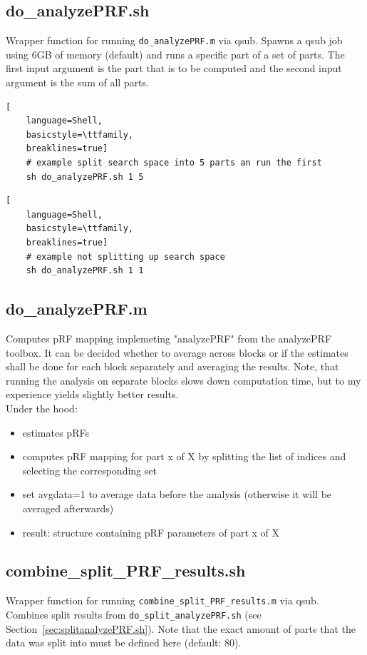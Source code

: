 \documentclass[12pt,a4paper]{scrartcl}
\begin{document}
\subsection{do\_analyzePRF.sh}
\label{sec:analyzePRF.sh}
Wrapper function for running \texttt{do\_analyzePRF.m} via qsub. Spawns a qsub job using 6GB of memory (default) and runs a specific part of a set of parts. The first input argument is the part that is to be computed and the second input argument is the sum of all parts.
\begin{lstlisting}[
    language=Shell,
    basicstyle=\ttfamily,
    breaklines=true]
    # example split search space into 5 parts an run the first
    sh do_analyzePRF.sh 1 5
\end{lstlisting}
\begin{lstlisting}[
    language=Shell,
    basicstyle=\ttfamily,
    breaklines=true]
    # example not splitting up search space
    sh do_analyzePRF.sh 1 1
\end{lstlisting}

\subsection{do\_analyzePRF.m}
Computes pRF mapping implemeting "analyzePRF" from the analyzePRF toolbox. It can be decided whether to average across blocks or if the estimates shall be done for each block separately and averaging the results. Note, that running the analysis on separate blocks slows down computation time, but to my experience yields slightly better results.\\

\noindent Under the hood:
\begin{itemize}
\item estimates pRFs
\item computes pRF mapping for part x of X by splitting the list of indices and selecting the corresponding set
\item set avgdata=1 to average data before the analysis (otherwise it will be averaged afterwards)
\item result: structure containing pRF parameters of part x of X
\end{itemize}

\subsection{combine\_split\_PRF\_results.sh}
\label{sec:combsplt}
Wrapper function for running \texttt{combine\_split\_PRF\_results.m} via qsub. Combines split results from \texttt{do\_split\_analyzePRF.sh} (see Section~\ref{sec:splitanalyzePRF.sh}). Note that the exact amount of parts that the data was split into must be defined here (default: 80).\\
\end{document}
